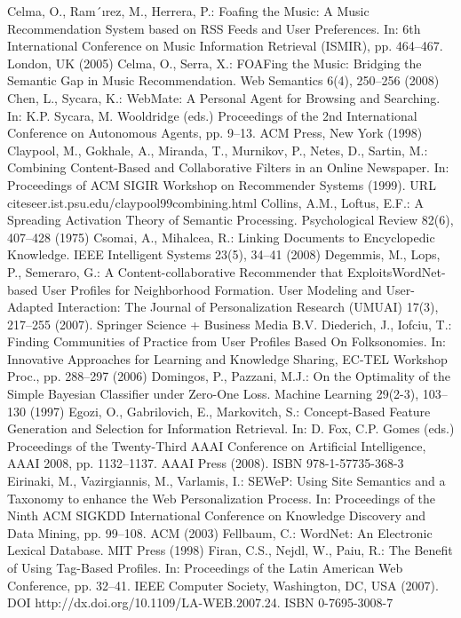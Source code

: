\begin{thebibliography}{110}
Celma, O., Ram´ırez, M., Herrera, P.: Foafing the Music: A Music Recommendation System based on RSS Feeds and User Preferences. In: 6th International Conference on Music Information Retrieval (ISMIR), pp. 464–467. London, UK (2005)
Celma, O., Serra, X.: FOAFing the Music: Bridging the Semantic Gap in Music Recommendation. Web Semantics 6(4), 250–256 (2008)
Chen, L., Sycara, K.: WebMate: A Personal Agent for Browsing and Searching. In: K.P. Sycara, M. Wooldridge (eds.) Proceedings of the 2nd International Conference on Autonomous Agents, pp. 9–13. ACM Press, New York (1998)
Claypool, M., Gokhale, A., Miranda, T., Murnikov, P., Netes, D., Sartin, M.: Combining Content-Based and Collaborative Filters in an Online Newspaper. In: Proceedings of ACM SIGIR Workshop on Recommender Systems (1999). URL citeseer.ist.psu.edu/claypool99combining.html
Collins, A.M., Loftus, E.F.: A Spreading Activation Theory of Semantic Processing. Psychological Review 82(6), 407–428 (1975)
Csomai, A., Mihalcea, R.: Linking Documents to Encyclopedic Knowledge. IEEE Intelligent Systems 23(5), 34–41 (2008)
Degemmis, M., Lops, P., Semeraro, G.: A Content-collaborative Recommender that ExploitsWordNet- based User Profiles for Neighborhood Formation. User Modeling and User-Adapted Interaction: The Journal of Personalization Research (UMUAI) 17(3), 217–255 (2007). Springer Science + Business Media B.V.
Diederich, J., Iofciu, T.: Finding Communities of Practice from User Profiles Based On Folksonomies. In: Innovative Approaches for Learning and Knowledge Sharing, EC-TEL Workshop Proc., pp. 288–297 (2006)
Domingos, P., Pazzani, M.J.: On the Optimality of the Simple Bayesian Classifier under Zero-One Loss. Machine Learning 29(2-3), 103–130 (1997)
Egozi, O., Gabrilovich, E., Markovitch, S.: Concept-Based Feature Generation and Selection for Information Retrieval. In: D. Fox, C.P. Gomes (eds.) Proceedings of the Twenty-Third AAAI Conference on Artificial Intelligence, AAAI 2008, pp. 1132–1137. AAAI Press (2008). ISBN 978-1-57735-368-3
Eirinaki, M., Vazirgiannis, M., Varlamis, I.: SEWeP: Using Site Semantics and a Taxonomy to enhance the Web Personalization Process. In: Proceedings of the Ninth ACM SIGKDD International Conference on Knowledge Discovery and Data Mining, pp. 99–108. ACM (2003)
Fellbaum, C.: WordNet: An Electronic Lexical Database. MIT Press (1998)
Firan, C.S., Nejdl, W., Paiu, R.: The Benefit of Using Tag-Based Profiles. In: Proceedings of the Latin American Web Conference, pp. 32–41. IEEE Computer Society, Washington, DC, USA (2007). DOI http://dx.doi.org/10.1109/LA-WEB.2007.24. ISBN 0-7695-3008-7

\end{thebibliography}
